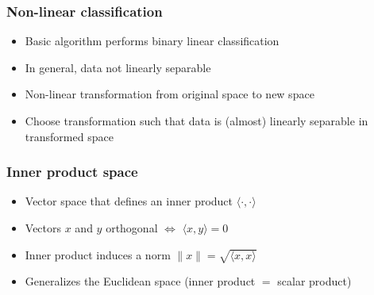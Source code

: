 \documentclass[10pt]{beamer}
\begin{document}



\begin{frame}
  \frametitle{Non-linear classification}
  \begin{itemize}
    \item Basic algorithm performs binary linear classification
    \item In general, data not linearly separable
    \item Non-linear {\color{red} transformation} from original space to new space
	\item Choose transformation such that data is (almost) linearly separable in transformed space
  \end{itemize}
\end{frame}

\begin{frame}
  \frametitle{Inner product space}
  \begin{itemize}
    \item Vector space that defines an {\color{red} inner product} $\langle\cdot,\cdot\rangle$
	\item Vectors $x$ and $y$ {\color{blue} orthogonal} $\Leftrightarrow$ $\langle x,y\rangle=0$
	\item Inner product induces a {\color{green} norm} $\|x\|=\sqrt{\langle x,x\rangle}$
    \item Generalizes the Euclidean space (inner product $=$ scalar product)
  \end{itemize}
\end{frame}
\end{document}
